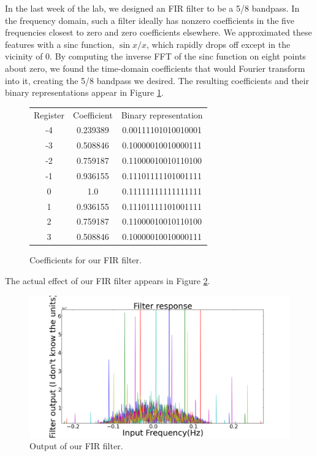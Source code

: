 \documentclass[11pt]{article}
\begin{document}
In the last week of the lab, we designed an FIR filter to be a 5/8 bandpass. In the frequency domain, such a filter ideally has nonzero coefficients in the five frequencies closest to zero and zero coefficients elsewhere. We approximated these features with a sinc function, $\sin{x}/x$, which rapidly drops off except in the vicinity of 0. By computing the inverse FFT of the sinc function on eight points about zero, we found the time-domain coefficients that would Fourier transform into it, creating the 5/8 bandpass we desired. The resulting coefficients and their binary representations appear in Figure \ref{table}.
\begin{figure}
\centering
\begin{tabular}{c|c|c}
Register & Coefficient & Binary representation \\
-4 & 0.239389 & 0.00111101010010001 \\
-3 & 0.508846 & 0.10000010010000111\\
-2 & 0.759187 & 0.11000010010110100\\
-1 & 0.936155 & 0.11101111101001111\\
0 & 1.0 & 0.11111111111111111\\
1 & 0.936155 & 0.11101111101001111\\
2 & 0.759187 & 0.11000010010110100\\
3 & 0.508846 & 0.10000010010000111\\
\end{tabular}
\caption{Coefficients for our FIR filter. \label{table}}
\end{figure}


The actual effect of our FIR filter appears in Figure \ref{fir}. %

\begin{figure}
\centering
\includegraphics[scale=0.35]{pictures/fir}
\caption{Output of our FIR filter. \label{fir}}
\end{figure}
\end{document}
